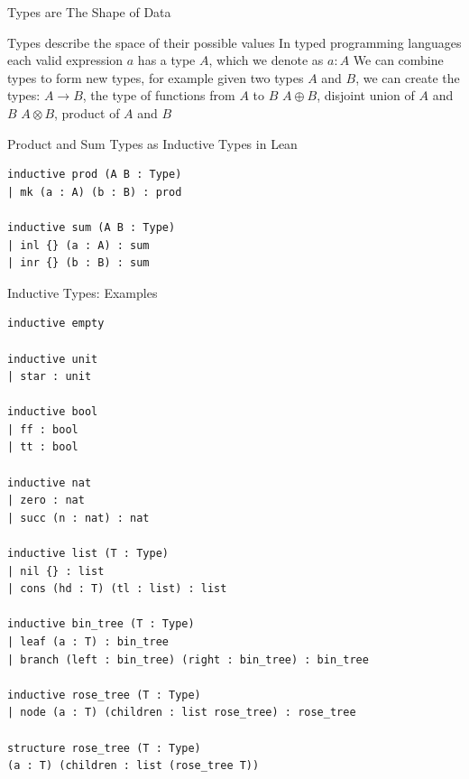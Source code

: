 \documentclass[pdf]{beamer}
\begin{document}
\begin{frame}{Types are The Shape of Data}
  \begin{outline}
    \1 Types describe the space of their possible values
    \1 In typed programming languages each valid expression $a$ has a type $A$, which we denote as $a : A$
    \1 We can combine types to form new types, for example given two types $A$ and $B$, we can create the types:
    \2 $A \to B$, the type of functions from $A$ to $B$
    \2 $A \oplus B$, disjoint union of $A$ and $B$
    \2 $A \otimes B$, product of $A$ and $B$
  \end{outline}
\end{frame}

\begin{frame}[fragile]{Product and Sum Types as Inductive Types in Lean}
  \begin{verbatim}
inductive prod (A B : Type)
| mk (a : A) (b : B) : prod

inductive sum (A B : Type)
| inl {} (a : A) : sum
| inr {} (b : B) : sum
  \end{verbatim}
\end{frame}

\begin{frame}[fragile]{Inductive Types: Examples}
  \begin{verbatim}
inductive empty

inductive unit
| star : unit

inductive bool
| ff : bool
| tt : bool

inductive nat
| zero : nat
| succ (n : nat) : nat

inductive list (T : Type)
| nil {} : list
| cons (hd : T) (tl : list) : list

inductive bin_tree (T : Type)
| leaf (a : T) : bin_tree
| branch (left : bin_tree) (right : bin_tree) : bin_tree

inductive rose_tree (T : Type)
| node (a : T) (children : list rose_tree) : rose_tree

structure rose_tree (T : Type)
(a : T) (children : list (rose_tree T))
  \end{verbatim}
\end{frame}
\end{document}
